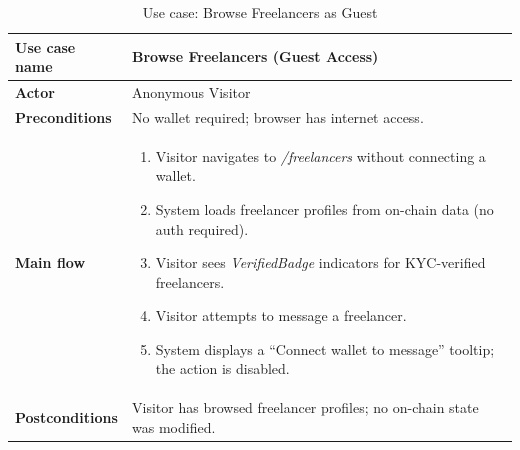 \begin{table}[H]
\centering
\caption{Use case: Browse Freelancers as Guest}
\begin{tabular}{|l|p{10cm}|}
\hline
\textbf{Use case name} & Browse Freelancers (Guest Access) \\ \hline
\textbf{Actor} & Anonymous Visitor \\ \hline
\textbf{Preconditions} & No wallet required; browser has internet access. \\ \hline
\textbf{Main flow} & \begin{enumerate}[noitemsep]
    \item Visitor navigates to \emph{/freelancers} without connecting a wallet.
    \item System loads freelancer profiles from on-chain data (no auth required).
    \item Visitor sees \emph{VerifiedBadge} indicators for KYC-verified freelancers.
    \item Visitor attempts to message a freelancer.
    \item System displays a ``Connect wallet to message'' tooltip; the action is disabled.
\end{enumerate} \\ \hline
\textbf{Postconditions} & Visitor has browsed freelancer profiles; no on-chain state was modified. \\ \hline
\end{tabular}
\end{table}
